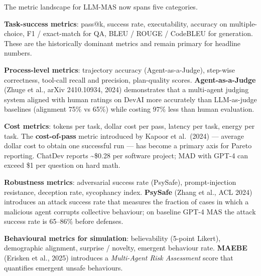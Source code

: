 The metric landscape for LLM-MAS now spans five categories.

\textbf{Task-success metrics}: pass@k, success rate, executability, accuracy on multiple-choice, F1 / exact-match for QA, BLEU / ROUGE / CodeBLEU for generation. These are the historically dominant metrics and remain primary for headline numbers.

\textbf{Process-level metrics}: trajectory accuracy (Agent-as-a-Judge), step-wise correctness, tool-call recall and precision, plan-quality scores. \textbf{Agent-as-a-Judge} (Zhuge et al., arXiv 2410.10934, 2024) demonstrates that a multi-agent judging system aligned with human ratings on DevAI more accurately than LLM-as-judge baselines (alignment 75\% vs 65\%) while costing 97\% less than human evaluation.

\textbf{Cost metrics}: tokens per task, dollar cost per pass, latency per task, energy per task. The \textbf{cost-of-pass} metric introduced by Kapoor et al.~(2024) --- average dollar cost to obtain one successful run --- has become a primary axis for Pareto reporting. ChatDev reports \textasciitilde\$0.28 per software project; MAD with GPT-4 can exceed \$1 per question on hard math.

\textbf{Robustness metrics}: adversarial success rate (PsySafe), prompt-injection resistance, deception rate, sycophancy index. \textbf{PsySafe} (Zhang et al., ACL 2024) introduces an attack success rate that measures the fraction of cases in which a malicious agent corrupts collective behaviour; on baseline GPT-4 MAS the attack success rate is 65--86\% before defenses.

\textbf{Behavioural metrics for simulation}: believability (5-point Likert), demographic alignment, surprise / novelty, emergent behaviour rate. \textbf{MAEBE} (Erisken et al., 2025) introduces a \emph{Multi-Agent Risk Assessment} score that quantifies emergent unsafe behaviours.

